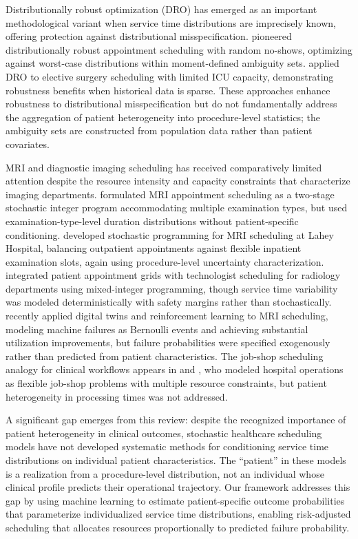 Distributionally robust optimization (DRO) has emerged as an important methodological variant when service time distributions are imprecisely known, offering protection against distributional misspecification. \citet{jiang2017integer} pioneered distributionally robust appointment scheduling with random no-shows, optimizing against worst-case distributions within moment-defined ambiguity sets. \citet{shehadeh2021distributionally} applied DRO to elective surgery scheduling with limited ICU capacity, demonstrating robustness benefits when historical data is sparse. These approaches enhance robustness to distributional misspecification but do not fundamentally address the aggregation of patient heterogeneity into procedure-level statistics; the ambiguity sets are constructed from population data rather than patient covariates.

MRI and diagnostic imaging scheduling has received comparatively limited attention despite the resource intensity and capacity constraints that characterize imaging departments. \citet{qiu2019mri} formulated MRI appointment scheduling as a two-stage stochastic integer program accommodating multiple examination types, but used examination-type-level duration distributions without patient-specific conditioning. \citet{li2021stochastic} developed stochastic programming for MRI scheduling at Lahey Hospital, balancing outpatient appointments against flexible inpatient examination slots, again using procedure-level uncertainty characterization. \citet{bouguerra2023integrating} integrated patient appointment grids with technologist scheduling for radiology departments using mixed-integer programming, though service time variability was modeled deterministically with safety margins rather than stochastically. \citet{lopez2025mri} recently applied digital twins and reinforcement learning to MRI scheduling, modeling machine failures as Bernoulli events and achieving substantial utilization improvements, but failure probabilities were specified exogenously rather than predicted from patient characteristics. The job-shop scheduling analogy for clinical workflows appears in \citet{burdett2018flexible} and \citet{pham2008surgical}, who modeled hospital operations as flexible job-shop problems with multiple resource constraints, but patient heterogeneity in processing times was not addressed.

A significant gap emerges from this review: despite the recognized importance of patient heterogeneity in clinical outcomes, stochastic healthcare scheduling models have not developed systematic methods for conditioning service time distributions on individual patient characteristics. The ``patient'' in these models is a realization from a procedure-level distribution, not an individual whose clinical profile predicts their operational trajectory. Our framework addresses this gap by using machine learning to estimate patient-specific outcome probabilities that parameterize individualized service time distributions, enabling risk-adjusted scheduling that allocates resources proportionally to predicted failure probability.

